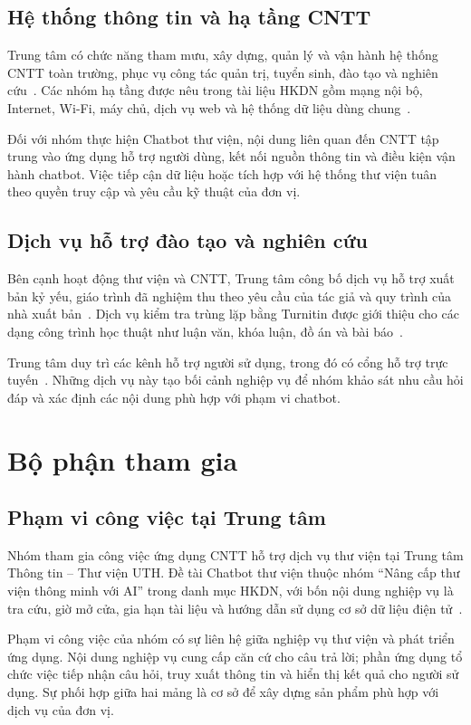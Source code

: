 \subsection{Hệ thống thông tin và hạ tầng CNTT}
Trung tâm có chức năng tham mưu, xây dựng, quản lý và vận hành hệ thống CNTT toàn trường, phục vụ công tác quản trị, tuyển sinh, đào tạo và nghiên cứu~\cite{lic-gioi-thieu}. Các nhóm hạ tầng được nêu trong tài liệu HKDN gồm mạng nội bộ, Internet, Wi-Fi, máy chủ, dịch vụ web và hệ thống dữ liệu dùng chung~\cite{hkdn-de-tai}.

Đối với nhóm thực hiện Chatbot thư viện, nội dung liên quan đến CNTT tập trung vào ứng dụng hỗ trợ người dùng, kết nối nguồn thông tin và điều kiện vận hành chatbot. Việc tiếp cận dữ liệu hoặc tích hợp với hệ thống thư viện tuân theo quyền truy cập và yêu cầu kỹ thuật của đơn vị.

\subsection{Dịch vụ hỗ trợ đào tạo và nghiên cứu}
Bên cạnh hoạt động thư viện và CNTT, Trung tâm công bố dịch vụ hỗ trợ xuất bản kỷ yếu, giáo trình đã nghiệm thu theo yêu cầu của tác giả và quy trình của nhà xuất bản~\cite{lic-xuat-ban}. Dịch vụ kiểm tra trùng lặp bằng Turnitin được giới thiệu cho các dạng công trình học thuật như luận văn, khóa luận, đồ án và bài báo~\cite{lic-trung-lap}.

Trung tâm duy trì các kênh hỗ trợ người sử dụng, trong đó có cổng hỗ trợ trực tuyến~\cite{lic-ho-tro}. Những dịch vụ này tạo bối cảnh nghiệp vụ để nhóm khảo sát nhu cầu hỏi đáp và xác định các nội dung phù hợp với phạm vi chatbot.

\section{Bộ phận tham gia}

\subsection{Phạm vi công việc tại Trung tâm}
Nhóm tham gia công việc ứng dụng CNTT hỗ trợ dịch vụ thư viện tại Trung tâm Thông tin -- Thư viện UTH. Đề tài Chatbot thư viện thuộc nhóm “Nâng cấp thư viện thông minh với AI” trong danh mục HKDN, với bốn nội dung nghiệp vụ là tra cứu, giờ mở cửa, gia hạn tài liệu và hướng dẫn sử dụng cơ sở dữ liệu điện tử~\cite{hkdn-de-tai}.

Phạm vi công việc của nhóm có sự liên hệ giữa nghiệp vụ thư viện và phát triển ứng dụng. Nội dung nghiệp vụ cung cấp căn cứ cho câu trả lời; phần ứng dụng tổ chức việc tiếp nhận câu hỏi, truy xuất thông tin và hiển thị kết quả cho người sử dụng. Sự phối hợp giữa hai mảng là cơ sở để xây dựng sản phẩm phù hợp với dịch vụ của đơn vị.

